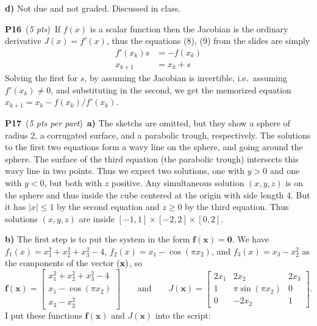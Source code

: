 \documentclass[11pt]{amsart}
\newcommand{\bbf}{\mathbf{f}}
\newcommand{\bx}{\mathbf{x}}
\newcommand{\bzero}{\mathbf{0}}
\newcommand{\mfile}[2]{
\bigskip
\begin{quote}
\medskip
\VerbatimInput[frame=single,framesep=3mm,label=\fbox{\normalsize \textsl{\,#1\,}},fontfamily=courier,fontsize=\scriptsize]{#2}
\medskip
\end{quote}
}
\newcommand{\probpts}[2]{\bigskip\noindent\large \textbf{#1} \normalsize \,(\emph{#2})\,}
\newcommand{\ppart}[1]{\quad \textbf{#1)} }
\newcommand{\epart}[1]{\medskip\noindent\textbf{#1)}}
\begin{document}
\epart{d}  Not due and not graded.  Discussed in class.


\probpts{P16}{5 pts}  If $f(x)$ is a scalar function then the Jacobian is the ordinary derivative $J(x) = f'(x)$, thus the equations (8), (9) from the slides are simply
\begin{align*}
f'(x_k) s &= -f(x_k) \\
x_{k+1} &= x_k + s
\end{align*}
Solving the first for $s$, by assuming the Jacobian is invertible, i.e.~assuming $f'(x_k)\ne 0$, and substituting in the second, we get the memorized equation $x_{k+1} = x_k - f(x_k) / f'(x_k)$.


\clearpage\newpage
\probpts{P17}{5 pts per part}  \ppart{a}  The sketchs are omitted, but they show a sphere of radius 2, a corrugated surface, and a parabolic trough, respectively.  The solutions to the first two equations form a wavy line on the sphere, and going around the sphere.  The surface of the third equation (the parabolic trough) intersects this wavy line in two points.  Thus we expect two solutions, one with $y>0$ and one with $y<0$, but both with $z$ positive.  Any simultaneous solution $(x,y,z)$ is on the sphere and thus inside the cube centered at the origin with side length 4.  But it has $|x|\le 1$ by the second equation and $z\ge 0$ by the third equation.  Thus solutions $(x,y,z)$ are inside $[-1,1]\times [-2,2] \times [0,2]$.

\epart{b}  The first step is to put the system in the form $\bbf(\bx)=\bzero$.  We have $f_1(x) = x_1^2 + x_2^2 + x_3^2 - 4$, $f_2(x) = x_1 - \cos(\pi x_2)$, and $f_3(x) = x_3 - x_2^2$ as the components of the vector $\bf(\bx)$, so
  $$\bbf(\bx) = \begin{bmatrix} x_1^2 + x_2^2 + x_3^2 - 4 \\ x_1 - \cos(\pi x_2) \\ x_3 - x_2^2 \end{bmatrix} \qquad \text{and} \qquad J(\bx) = \begin{bmatrix} 2 x_1 & 2 x_2 & 2 x_3 \\ 1 & \pi \sin(\pi x_2) & 0 \\ 0 & -2 x_2 & 1 \end{bmatrix}.$$
I put these functions $\bbf(\bx)$ and $J(\bx)$ into the script:

\mfile{newtonex.m}{newtonex.m}
\end{document}
